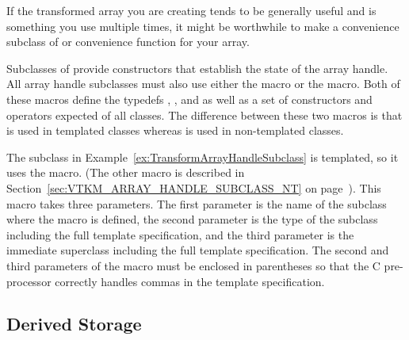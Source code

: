 
If the transformed array you are creating tends to be generally useful and
is something you use multiple times, it might be worthwhile to make a
convenience subclass of  or convenience
 function for your array.


\label{sec:VTKM_ARRAY_HANDLE_SUBCLASS}

Subclasses of  provide constructors that
establish the state of the array handle. All array handle subclasses must
also use either the  macro or the
 macro. Both of these macros
define the typedefs , , and
 as well as a set of constructors and operators
expected of all  classes. The difference
between these two macros is that 
is used in templated classes whereas
 is used in non-templated
classes.

The  subclass in
Example~\ref{ex:TransformArrayHandleSubclass} is templated, so it uses the
 macro. (The other macro is
described in Section~\ref{sec:VTKM_ARRAY_HANDLE_SUBCLASS_NT} on
page~\pageref{sec:VTKM_ARRAY_HANDLE_SUBCLASS_NT}). This macro takes three
parameters. The first parameter is the name of the subclass where the macro
is defined, the second parameter is the type of the subclass including the
full template specification, and the third parameter is the immediate
superclass including the full template specification. The second and third
parameters of the macro must be enclosed in parentheses so that the C
pre-processor correctly handles commas in the template specification.



\subsection{Derived Storage}
\label{sec:DerivedStorage}


